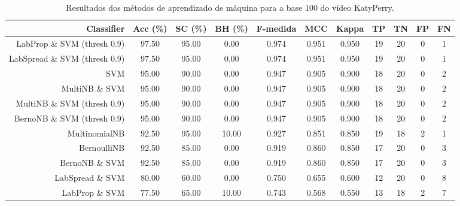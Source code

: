 \begin{table}[!htb]
\centering
\caption{Resultados dos métodos de aprendizado de máquina para a base 100 do vídeo KatyPerry.}
\label{tab:KatyPerry-100}
\begin{tabular}{r|c|c|c|c|c|c|c|c|c|c}
\hline\hline
Classifier & Acc (\%) & SC (\%) & BH (\%) & F-medida & MCC & Kappa & TP & TN & FP & FN \\ \hline
LabProp \& SVM (thresh 0.9) & 97.50 & 95.00 & 0.00 & 0.974 & 0.951 & 0.950 & 19 & 20 & 0 & 1 \\ 
LabSpread \& SVM (thresh 0.9) & 97.50 & 95.00 & 0.00 & 0.974 & 0.951 & 0.950 & 19 & 20 & 0 & 1 \\ 
SVM & 95.00 & 90.00 & 0.00 & 0.947 & 0.905 & 0.900 & 18 & 20 & 0 & 2 \\ 
MultiNB \& SVM & 95.00 & 90.00 & 0.00 & 0.947 & 0.905 & 0.900 & 18 & 20 & 0 & 2 \\ 
MultiNB \& SVM (thresh 0.9) & 95.00 & 90.00 & 0.00 & 0.947 & 0.905 & 0.900 & 18 & 20 & 0 & 2 \\ 
BernoNB \& SVM (thresh 0.9) & 95.00 & 90.00 & 0.00 & 0.947 & 0.905 & 0.900 & 18 & 20 & 0 & 2 \\ 
MultinomialNB & 92.50 & 95.00 & 10.00 & 0.927 & 0.851 & 0.850 & 19 & 18 & 2 & 1 \\ 
BernoulliNB & 92.50 & 85.00 & 0.00 & 0.919 & 0.860 & 0.850 & 17 & 20 & 0 & 3 \\ 
BernoNB \& SVM & 92.50 & 85.00 & 0.00 & 0.919 & 0.860 & 0.850 & 17 & 20 & 0 & 3 \\ 
LabSpread \& SVM & 80.00 & 60.00 & 0.00 & 0.750 & 0.655 & 0.600 & 12 & 20 & 0 & 8 \\ 
LabProp \& SVM & 77.50 & 65.00 & 10.00 & 0.743 & 0.568 & 0.550 & 13 & 18 & 2 & 7 \\ 
\hline\hline
\end{tabular}
\end{table}
